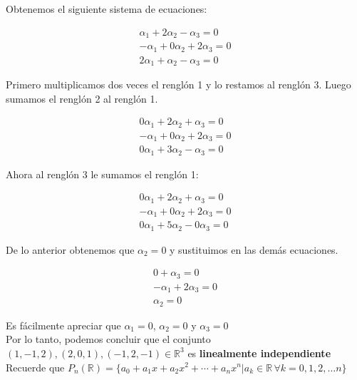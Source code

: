 \documentclass[letterpaper]{article}
\renewcommand{\*}{\cdot}
\theoremstyle{definition}
\begin{document}
Obtenemos el siguiente sistema de ecuaciones:
\begin{center}
	\begin{align*}
	\alpha_{1}+2\alpha_{2}-\alpha_{3}=0\\
	-\alpha_{1}+0\alpha_{2}+2\alpha_{3}=0\\
	2\alpha_{1}+\alpha_{2}-\alpha_{3}=0
	\end{align*}
\end{center}

Primero multiplicamos dos veces el renglón 1 y lo restamos al renglón 3. Luego sumamos el renglón 2 al renglón 1.
\begin{center}
	\begin{align*}
	0\alpha_{1}+2\alpha_{2}+\alpha_{3}=0\\
	-\alpha_{1}+0\alpha_{2}+2\alpha_{3}=0\\
	0\alpha_{1}+3\alpha_{2}-\alpha_{3}=0
	\end{align*}
\end{center}

Ahora al renglón 3 le sumamos el renglón 1:

\begin{center}
	\begin{align*}
	0\alpha_{1}+2\alpha_{2}+\alpha_{3}=0\\
	-\alpha_{1}+0\alpha_{2}+2\alpha_{3}=0\\
	0\alpha_{1}+5\alpha_{2}-0\alpha_{3}=0
	\end{align*}
\end{center}

De lo anterior obtenemos que $\alpha_{2}= 0$ y sustituimos en las demás ecuaciones.

\begin{center}
	\begin{align*}
	0+\alpha_{3}=0\\
	-\alpha_{1}+2\alpha_{3}=0\\
	\alpha_{2}=0
	\end{align*}
\end{center}

Es fácilmente apreciar que $\alpha_{1}=0$, $\alpha_{2}=0$ y $\alpha_{3}=0$\\

Por lo tanto, podemos concluir que el conjunto $ (1,-1,2), (2,0,1),(-1,2,-1) \in \mathbb{R}^{3}$ es \textbf{linealmente independiente}\\

Recuerde que $P_{n}(\mathbb{R}) = \{ a_0 +  a_1x +  a_2x^2 + \cdots +  a_n x^n \big\vert a_k \in \mathbb{R} \,  \forall k = 0,1,2,\dots n\}$
\\
\end{document}
